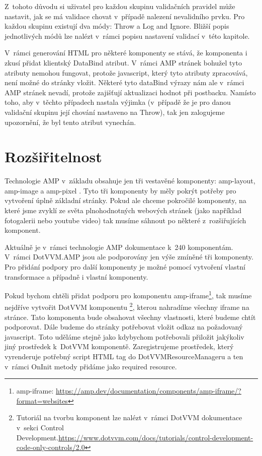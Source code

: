 Z~tohoto důvodu si uživatel pro každou skupinu validačních pravidel může nastavit, jak se má validace chovat v~případě nalezení nevalidního prvku. Pro každou skupinu existují dva módy: Throw a Log and Ignore. Bližší popis jednotlivých módů lze nalézt v~rámci popisu nastavení validací v~této kapitole.

V~rámci generování HTML pro některé komponenty se stává, že komponenta i zkusí přidat klientský DataBind atribut. V~rámci AMP stránek bohužel tyto atributy nemohou fungovat, protože javascript, který tyto atributy zpracovává, není možné do stránky vložit. Některé tyto dataBind výrazy nám ale v~rámci AMP stránek nevadí, protože zajišťují aktualizaci hodnot při postbacku. Namísto toho, aby v~těchto případech nastala výjimka (v~případě že je pro danou validační skupinu její chování nastaveno na Throw), tak jen zalogujeme upozornění, že byl tento atribut vynechán.

\section{Rozšiřitelnost}
Technologie AMP v~základu obsahuje jen tři vestavěné komponenty: amp-layout, amp-image a amp-pixel \cite[Ch.\ 3, p.\ 160]{VzhuruDoAMP}. Tyto tři komponenty by měly pokrýt potřeby pro vytvoření úplně základní stránky. Pokud ale chceme pokročilé komponenty, na které jsme zvyklí ze světa plnohodnotných webových stránek (jako například fotogalerii nebo youtube video) tak musíme sáhnout po některé z~rozšiřujících komponent.

Aktuálně je v~rámci technologie AMP dokumentace k~240 komponentám. V~rámci DotVVM.AMP jsou ale podporovány jen výše zmíněné tři komponenty. Pro přidání podpory pro další komponenty je možné pomocí vytvoření vlastní transformace a případně i vlastní komponenty.

Pokud bychom chtěli přidat podporu pro komponentu amp-iframe\footnote{amp-iframe: \url{https://amp.dev/documentation/components/amp-iframe/?format=websites}}, tak musíme nejdříve vytvořit DotVVM komponentu \footnote{Tutoriál na tvorbu komponent lze nalézt v~rámci DotVVM dokumentace v~sekci Control Development.\newline \url{https://www.dotvvm.com/docs/tutorials/control-development-code-only-controls/2.0}}, kterou nahradíme všechny iframe na stránce. Tato komponenta bude obsahovat všechny vlastnosti, které budeme chtít podporovat.
Dále budeme do stránky potřebovat vložit odkaz na požadovaný javascript. Toto uděláme stejně jako kdybychom potřebovali přiložit jakýkoliv jiný prostředek k~DotVVM komponentě. Zaregistrujeme prostředek, který vyrenderuje potřebný script HTML tag do DotVVMResourceManageru a ten v~rámci OnInit metody přidáme jako required resource.

